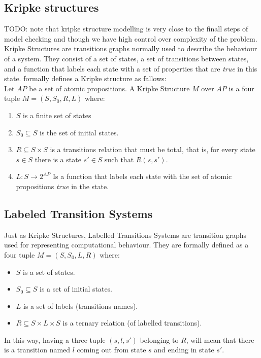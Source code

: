 \documentclass[12pt]{article}
\newcommand{\todo}[1]{{\color{red}TODO: #1}}
\begin{document}
\subsection{Kripke structures}\label{kripke} \todo{note that kripke structure modelling is very close to the finall steps of model checking and though we have high control over complexity of the problem.}\\
Kripke Structures are transitions graphs normally used to describe the behaviour of a system. They consist of a set of states, a set of transitions between states, and a function that labels each state with a set of properties that are \textit{true} in this state. \cite{clarke} formally defines a Kripke structure as fallows:\\

Let $AP$ be a set of atomic propositions. A Kripke Structure $M$ over $AP$ is a four tuple $M=(S,S_0,R,L)$ where:
\begin{enumerate}
\item $S$ is a finite set of states
\item $S_0 \subseteq S$ is the set of initial states.
\item $R \subseteq S \times S$ is a transitions relation that must be total, that is, for every state $s \in S$ there is a state $s' \in S$ such that $R(s,s')$.
\item $L : S \rightarrow 2^{AP}$ Is a function that labels each state with the set of atomic propositions \textit{true} in the state.
\end{enumerate}


\subsection{Labeled Transition Systems}\label{lts}
Just as Kripke Structures, Labelled Transitions Systems are transition graphs used for representing computational behaviour. They are formally defined as a four tuple $M = (S,S_{0},L,R)$ where:
\begin{itemize}
\item $S$ is a set of states.
\item $S_0 \subseteq S$ is a set of initial states.
\item $L$ is a set of labels (transitions names).
\item $R \subseteq S \times L \times S$ is a ternary relation (of labelled transitions).
\end{itemize}
In this way, having a three tuple $(s,l,s')$ belonging to $R$, will mean that there is a transition named $l$ coming out from state $s$ and ending in state $s'$.
\end{document}

